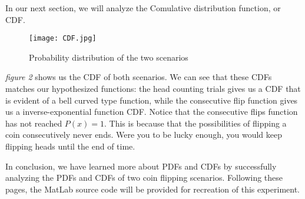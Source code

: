 \documentclass{report}
\begin{document}
In our next section, we will analyze the Comulative distribution function, or CDF.
\pagebreak

\newpage
\begin{figure}
    \centering
    \texttt{[image: CDF.jpg]}
    \caption{Probability distribution of the two scenarios}
\end{figure} 

\textit{figure 2} shows us the CDF of both scenarios. We can see that these CDFs matches our hypothesized functions: the head counting trials gives us a CDF that is evident of a bell curved type function, while the consecutive flip function gives us a inverse-exponential function CDF. Notice that the consecutive flips function has not reached $P(x) = 1$. This is because that the possibilities of flipping a coin consecutively never ends. Were you to be lucky enough, you would keep flipping heads until the end of time.

In conclusion, we have learned more about PDFs and CDFs by successfully analyzing the PDFs and CDFs of two coin flipping scenarios. Following these pages, the MatLab source code will be provided for recreation of this experiment.

\pagebreak
\end{document}
